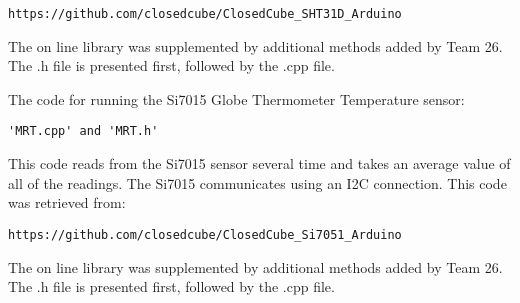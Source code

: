 \documentclass[12pt,letterpaper,titlepage]{article}
\begin{document}
\begin{verbatim}
https://github.com/closedcube/ClosedCube_SHT31D_Arduino
\end{verbatim}
The on line library was supplemented by additional methods added by Team 26. The .h file is presented first, followed by the .cpp file.


The code for running the Si7015 Globe Thermometer Temperature sensor:
\begin{verbatim}
'MRT.cpp' and 'MRT.h'
\end{verbatim}
This code reads from the Si7015 sensor several time and takes an average value of all of the readings. The Si7015 communicates using an I2C connection. This code was retrieved from:
\begin{verbatim}
https://github.com/closedcube/ClosedCube_Si7051_Arduino
\end{verbatim}
The on line library was supplemented by additional methods added by Team 26. The .h file is presented first, followed by the .cpp file.


\end{document}
